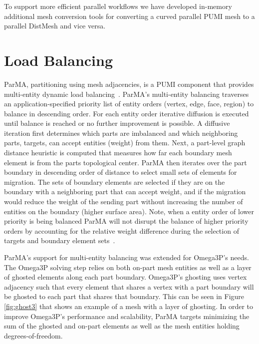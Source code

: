 \documentclass[a4paper]{article}
\begin{document}
To support more efficient parallel workflows we have developed in-memory
additional mesh conversion tools for converting a curved parallel PUMI mesh to a
parallel DistMesh and vice versa.

\section{Load Balancing}\label{sec:parma}
ParMA, partitioning using mesh adjacencies, is a PUMI component that provides
multi-entity dynamic load balancing~\cite{SmithParma2015}.
ParMA's multi-entity balancing traverses an
application-specified priority list of entity orders (vertex, edge, face,
region) to balance in descending order.
For each entity order iterative diffusion is executed until balance is reached
or no further improvement is possible.
A diffusive iteration first determines which parts are imbalanced and which
neighboring parts, targets, can accept entities (weight) from them.
Next, a part-level graph distance heuristic is computed that measures how far each
boundary mesh element is from the parts topological center.
ParMA then iterates over the part boundary in descending order of distance to
select small sets of elements for migration.
The sets of boundary elements are selected if they are on the boundary with a
neighboring part that can accept weight, and if the migration would reduce the
weight of the sending part without increasing the number of entities on the
boundary (higher surface area).
Note, when a entity order of lower priority is being balanced ParMA will not disrupt
the balance of higher priority orders by accounting for the relative weight
difference during the selection of targets and boundary element
sets~\cite{SmithParma2015}.

ParMA's support for multi-entity balancing was extended for Omega3P's needs.
The Omega3P solving step relies on both on-part mesh entities as well as a layer
of ghosted elements along each part boundary.
Omega3P's ghosting uses vertex adjacency such that every element that shares a
vertex with a part boundary will be ghosted to each part that shares that
boundary.
This can be seen in Figure \ref{fig:ghost3} that shows an example of a mesh with
a layer of ghosting.
In order to improve Omega3P's performance and scalability, ParMA targets
minimizing the sum of the ghosted and on-part elements as well as the mesh
entities holding degrees-of-freedom.
\end{document}
